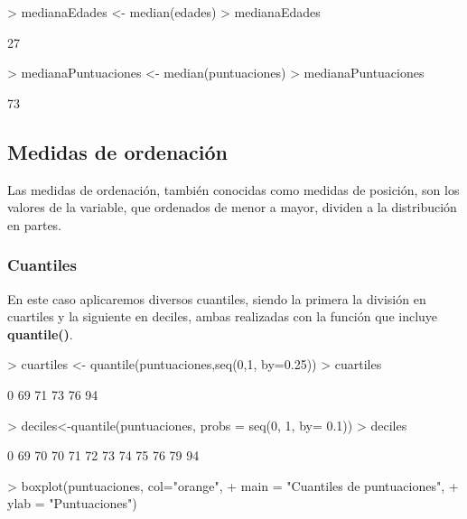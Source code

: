\documentclass [a4paper] {article}
\begin{document}
\begin{Schunk}
\begin{Sinput}
> medianaEdades <- median(edades)
> medianaEdades 
\end{Sinput}
\begin{Soutput}
[1] 27
\end{Soutput}
\begin{Sinput}
> medianaPuntuaciones <- median(puntuaciones)
> medianaPuntuaciones 
\end{Sinput}
\begin{Soutput}
[1] 73
\end{Soutput}
\end{Schunk}

\subsection{Medidas de ordenación}
Las medidas de ordenación, también conocidas como medidas de posición, son los valores de la variable, que ordenados de menor a mayor, dividen a la distribución en partes.

\subsubsection{ Cuantiles}
En este caso aplicaremos diversos cuantiles, siendo la primera la división en cuartiles y la siguiente en deciles, ambas realizadas con la función que incluye \textbf{quantile()}.

\begin{Schunk}
\begin{Sinput}
> cuartiles <- quantile(puntuaciones,seq(0,1, by=0.25))
> cuartiles 
\end{Sinput}
\begin{Soutput}
  0%
  69   71   73   76   94 
\end{Soutput}
\begin{Sinput}
> deciles<-quantile(puntuaciones, probs = seq(0, 1, by= 0.1))
> deciles
\end{Sinput}
\begin{Soutput}
  0%
  69   70   70   71   72   73   74   75   76   79   94 
\end{Soutput}
\end{Schunk}

\begin{Schunk}
\begin{Sinput}
> boxplot(puntuaciones, col="orange", 
+         main = "Cuantiles de puntuaciones",
+         ylab = "Puntuaciones")
\end{Sinput}
\end{Schunk}
\end{document}
